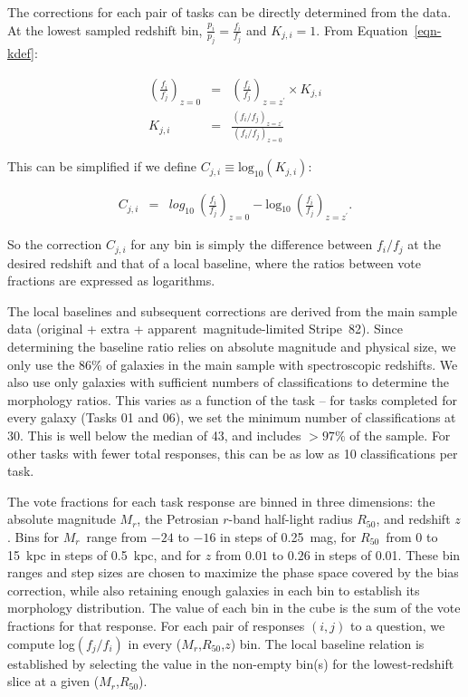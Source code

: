 \documentclass[useAMS,usenatbib]{mn2e}
\newcommand{\mr}{$M_r$}
\newcommand{\rfifty}{$R_{50}$}
\newcommand{\redshift}{$z$}
\begin{document}
The corrections for each pair of tasks can be directly determined from the data. At the lowest sampled redshift bin, $\frac{p_i}{p_j} = \frac{f_i}{f_j}$ and $K_{j,i}=1$. From Equation~\ref{eqn-kdef}:

\begin{eqnarray}
\left(\frac{f_i}{f_j}\right)_{z=0} &=& \left(\frac{f_i}{f_j}\right)_{z=z^\prime}\times K_{j,i} \\
K_{j,i} &=& \frac{\left(f_i/f_j\right)_{z=z^\prime} }{ \left(f_i/f_j\right)_{z=0}}
\label{eqnarray-adjprob3}
\end{eqnarray}

\noindent This can be simplified if we define $C_{j,i}\equiv\text{log}_{10}(K_{j,i})$:

\begin{eqnarray}
C_{j,i} &=& \text{$log_{10}$}~\left(\frac{f_i}{f_j}\right)_{z=0} - \text{log$_{10}$}~\left(\frac{f_i}{f_j}\right)_{z=z^\prime}.
\label{eqnarray-adjprob4}
\end{eqnarray}

\noindent So the correction $C_{j,i}$ for any bin is simply the difference between $f_i/f_j$ at the desired redshift and that of a local baseline, where the ratios between vote fractions are expressed as logarithms.  

The local baselines and subsequent corrections are derived from the main sample data (original + extra + apparent~magnitude-limited Stripe~82). Since determining the baseline ratio relies on absolute magnitude and physical size, we only use the 86\% of galaxies in the main sample with spectroscopic redshifts. We also use only galaxies with sufficient numbers of classifications to determine the morphology ratios. This varies as a function of the task -- for tasks completed for every galaxy (Tasks 01 and 06), we set the minimum number of classifications at 30. This is well below the median of 43, and includes $>97\%$ of the sample. For other tasks with fewer total responses, this can be as low as 10 classifications per task. 

The vote fractions for each task response are binned in three dimensions: the absolute magnitude \mr, the Petrosian $r$-band half-light radius \rfifty, and redshift $z$. Bins for \mr~range from $-24$ to $-16$ in steps of 0.25~mag, for \rfifty~from 0 to 15~kpc in steps of 0.5~kpc, and for $z$ from $0.01$ to $0.26$ in steps of 0.01. These bin ranges and step sizes are chosen to maximize the phase space covered by the bias correction, while also retaining enough galaxies in each bin to establish its morphology distribution. The value of each bin in the cube is the sum of the vote fractions for that response. For each pair of responses $(i,j)$ to a question, we compute log$(f_j/f_i)$ in every (\mr,\rfifty,\redshift) bin. The local baseline relation is established by selecting the value in the non-empty bin(s) for the lowest-redshift slice at a given (\mr,\rfifty). 
\end{document}

